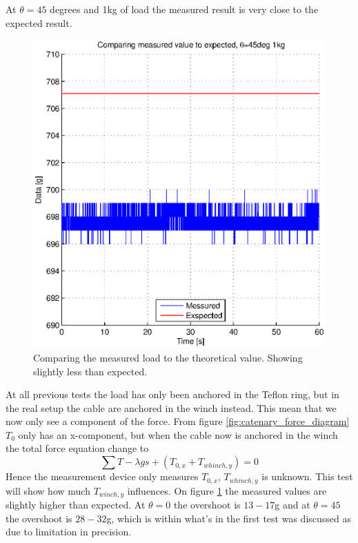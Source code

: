 At $\theta=45$ degrees and 1kg of load the measured result is very close to the expected result.

\begin{figure}[H]
\centering
\includegraphics[scale=0.75]{graphics/gcs_test/45degTheta1kg.eps}
\caption{Comparing the measured load to the theoretical value. Showing slightly less than expected.}
\label{fig:45degTheta1kg}
\end{figure}

\noindent
At all previous tests the load has only been anchored in the Teflon ring, but in the real setup the cable are anchored in the winch instead. This mean that we now only see a component of the force. From figure \ref{fig:catenary_force_diagram} $T_0$ only has an x-component, but when the cable now is anchored in the winch the total force equation change to
\begin{equation}
\sum T -\lambda gs + (T_{0,x} + T_{whinch,y} ) = 0
\end{equation}
Hence the measurement device only measures $T_{0,x}$, $T_{whinch,y}$ is unknown. This test will show how much $T_{winch,y}$ influences.
On figure \ref{fig:45degTheta1kg} the measured values are slightly higher than expected. At $\theta = 0$ the overshoot is $13-17$g and at $\theta = 45$ the overshoot is $28-32$g, which is within what's in the first test was discussed as due to limitation in precision. 

